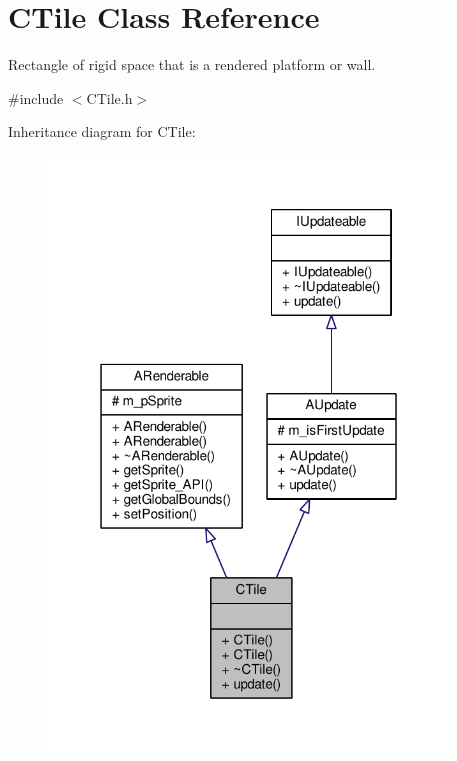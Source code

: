 \hypertarget{classCTile}{\section{C\-Tile Class Reference}
\label{classCTile}
}


Rectangle of rigid space that is a rendered platform or wall.  




{\ttfamily \#include $<$C\-Tile.\-h$>$}



Inheritance diagram for C\-Tile\-:
\nopagebreak
\begin{figure}[H]
\begin{center}
\leavevmode
\includegraphics[width=301pt]{classCTile__inherit__graph}
\end{center}
\end{figure}


